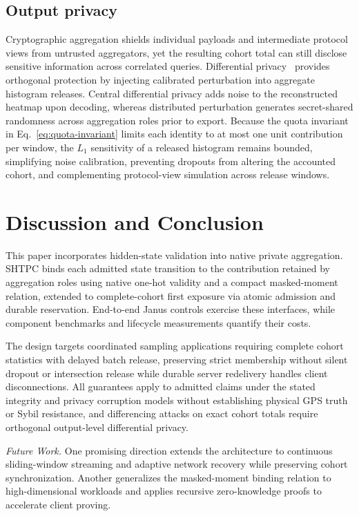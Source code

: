 \documentclass[conference,compsoc]{IEEEtran}
\theoremstyle{definition}
\numberwithin{equation}{section}
\numberwithin{table}{section}
\numberwithin{figure}{section}
\theoremstyle{plain}
\begin{document}
\subsection{Output privacy}
Cryptographic aggregation shields individual payloads and intermediate protocol views from untrusted aggregators, yet the resulting cohort total can still disclose sensitive information across correlated queries. Differential privacy~\cite{Dwork2014algorithmic,Bagdasaryan2022SparseHeatmaps} provides orthogonal protection by injecting calibrated perturbation into aggregate histogram releases. Central differential privacy adds noise to the reconstructed heatmap upon decoding, whereas distributed perturbation generates secret-shared randomness across aggregation roles prior to export. Because the quota invariant in Eq.~\eqref{eq:quota-invariant} limits each identity to at most one unit contribution per window, the \(L_1\) sensitivity of a released histogram remains bounded, simplifying noise calibration, preventing dropouts from altering the accounted cohort, and complementing protocol-view simulation across release windows.

\section{Discussion and Conclusion}
\label{sec:limitations}
\label{sec:conclusion}
This paper incorporates hidden-state validation into native private aggregation. SHTPC binds each admitted state transition to the contribution retained by aggregation roles using native one-hot validity and a compact masked-moment relation, extended to complete-cohort first exposure via atomic admission and durable reservation. End-to-end Janus controls exercise these interfaces, while component benchmarks and lifecycle measurements quantify their costs.

The design targets coordinated sampling applications requiring complete cohort statistics with delayed batch release, preserving strict membership without silent dropout or intersection release while durable server redelivery handles client disconnections. All guarantees apply to admitted claims under the stated integrity and privacy corruption models without establishing physical GPS truth or Sybil resistance, and differencing attacks on exact cohort totals require orthogonal output-level differential privacy.

\par\noindent\emph{Future Work.}
One promising direction extends the architecture to continuous sliding-window streaming and adaptive network recovery while preserving cohort synchronization. Another generalizes the masked-moment binding relation to high-dimensional workloads and applies recursive zero-knowledge proofs to accelerate client proving.
\end{document}
